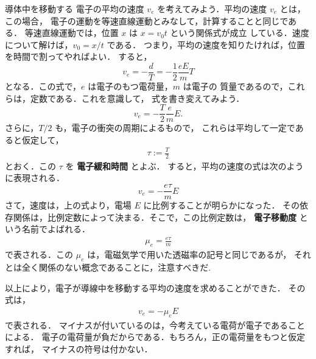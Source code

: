            導体中を移動する
            電子の平均の速度 $v_{e}$ を考えてみよう．平均の速度 $v_{e}$ とは，この場合，
            電子の運動を等速直線運動とみなして，計算することと同じである．
            等速直線運動では，位置 $x$ は $x = v_{0}t$ という関係式が成立
            している．速度について解けば，$v_{0} = x/t$ である．
            つまり，平均の速度を知りたければ，位置を時間で割ってやればよい．
            すると，
                \begin{equation*}
                    v_{e}  =  -\frac{d}{T} = -\frac{1}{2} \frac{eE}{m} T
                \end{equation*}
            となる．この式で，$e$ は電子のもつ電荷量，$m$ は電子の
            質量であるので，これらは，定数である．これを意識して，
            式を書き変えてみよう．
                \begin{equation*}
                    v_{e}  =   -\frac{T}{2} \frac{e}{m}E.
                \end{equation*}
            さらに，$T/2$ も，電子の衝突の周期によるもので，
            これらは平均して一定であると仮定して，
                \begin{align}
                    \tau := \frac{T}{2}
                \end{align}
            とおく．この $\tau$ を \textbf{電子緩和時間} とよぶ．
            すると，平均の速度の式は次のように表現される．
                \begin{equation*}
                    v_{e}   =  -\frac{e\tau}{m} E
                \end{equation*}
            さて，速度は，上の式より，電場 $E$ に比例することが明らかになった．
            その依存関係は，比例定数によって決まる．そこで，この比例定数は，
            \textbf{電子移動度} という名前でよばれる．
                \begin{align}
                    \mu_{e} =  \frac{e\tau}{m}
                \end{align}
            で表される．この $\mu_{e}$ は，電磁気学で用いた透磁率の記号と同じであるが，
            それとは全く関係のない概念であることに，注意すべきだ.

            以上により，電子が導線中を移動する平均の速度を求めることができた．
            その式は，
                \begin{align}
                    v_{e} =  -\mu_{e}E
                \end{align}
            で表される．
            マイナスが付いているのは，今考えている電荷が電子であることによる．
            電子の電荷量が負だからである．もちろん，正の電荷量をもつと仮定すれば，
            マイナスの符号は付かない．

